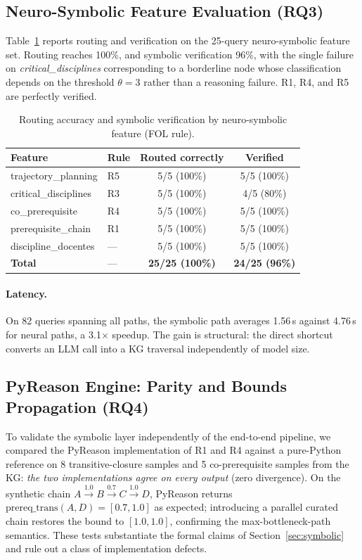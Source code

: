 \documentclass[runningheads]{llncs}
\begin{document}
\subsection{Neuro-Symbolic Feature Evaluation (RQ3)}

Table~\ref{tab:nsfeat} reports routing and verification on the 25-query neuro-symbolic feature set. Routing reaches 100\%, and symbolic verification 96\%, with the single failure on \textit{critical\_disciplines} corresponding to a borderline node whose classification depends on the threshold $\theta=3$ rather than a reasoning failure. R1, R4, and R5 are perfectly verified.

\begin{table}[t]
\caption{Routing accuracy and symbolic verification by neuro-symbolic feature (FOL rule).}
\label{tab:nsfeat}
\centering
\begin{tabular}{llcc}
\hline
\textbf{Feature} & \textbf{Rule} & \textbf{Routed correctly} & \textbf{Verified} \\
\hline
trajectory\_planning      & R5 & 5/5 (100\%) & 5/5 (100\%) \\
critical\_disciplines     & R3 & 5/5 (100\%) & 4/5 (80\%)  \\
co\_prerequisite          & R4 & 5/5 (100\%) & 5/5 (100\%) \\
prerequisite\_chain       & R1 & 5/5 (100\%) & 5/5 (100\%) \\
discipline\_docentes      & --- & 5/5 (100\%) & 5/5 (100\%) \\
\hline
\textbf{Total}            & --- & \textbf{25/25 (100\%)} & \textbf{24/25 (96\%)} \\
\hline
\end{tabular}
\end{table}

\paragraph{Latency.} On 82 queries spanning all paths, the symbolic path averages 1.56\,s against 4.76\,s for neural paths, a 3.1$\times$ speedup. The gain is structural: the direct shortcut converts an LLM call into a KG traversal independently of model size.


\subsection{PyReason Engine: Parity and Bounds Propagation (RQ4)}

To validate the symbolic layer independently of the end-to-end pipeline, we compared the PyReason implementation of R1 and R4 against a pure-Python reference on 8 transitive-closure samples and 5 co-prerequisite samples from the KG: \emph{the two implementations agree on every output} (zero divergence). On the synthetic chain $A \xrightarrow{1.0} B \xrightarrow{0.7} C \xrightarrow{1.0} D$, PyReason returns $\mathrm{prereq\_trans}(A,D) = [0.7,1.0]$ as expected; introducing a parallel curated chain restores the bound to $[1.0,1.0]$, confirming the max-bottleneck-path semantics. These tests substantiate the formal claims of Section~\ref{sec:symbolic} and rule out a class of implementation defects.
\end{document}
